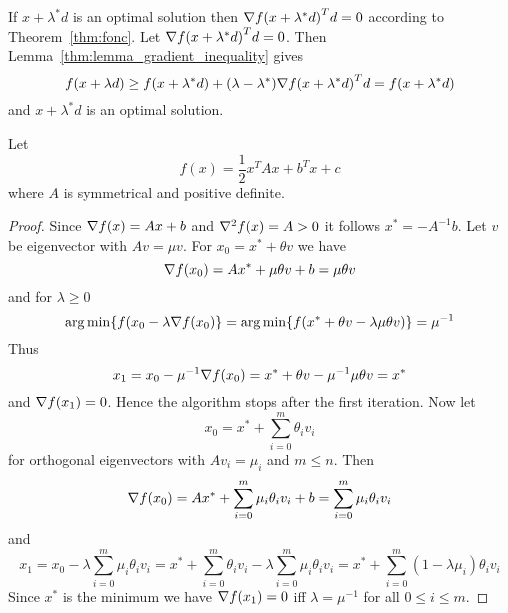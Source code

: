 \proof{}
If  \( x + \lambda^* d \) is an optimal solution then \( \nabla {f(x + \lambda^* d)}^T d = 0 \)
according to Theorem~\ref{thm:fonc}.
Let \( \nabla {f(x + \lambda^* d)}^T d = 0 \). Then Lemma~\ref{thm:lemma_gradient_inequality} gives
\[
    f(x + \lambda d) \ge f(x + \lambda^* d) + (\lambda - \lambda^*) \nabla {f(x + \lambda^* d)}^T d
    = f(x + \lambda^* d)
\]
and \( x + \lambda^* d \) is an optimal solution.
\bigskip


\begin{exercise}
    Let
    \[
        f(x) = \frac{1}{2} x^T{A}x + b^T x + c
    \]
    where \( A \) is symmetrical and positive definite.
\end{exercise}

\begin{proof}
    Since \( \nabla {f(x)} = Ax + b \) and \( \nabla^2 {f(x)} = A > 0 \) it follows \( x^* = -A^{-1}b \).
    Let \( v \) be eigenvector with \( Av = \mu v \). For \( x_0 = x^* + \theta v \) we have
    \[
        \nabla {f(x_0)} = Ax^* + \mu \theta v + b = \mu \theta v
    \]
    and for \(\lambda \ge 0 \)
    \[
        \operatorname*{arg\,min} \{ f(x_0 - \lambda \nabla f(x_0) \} =
            \operatorname*{arg\,min} \{ f(x^* + \theta v - \lambda \mu \theta v)\} = \mu^{-1}
    \]
    Thus
    \[
        x_1 = x_0 - \mu^{-1} \nabla f(x_0) = x^* + \theta v - \mu^{-1} \mu \theta v = x^*
    \]
    and \( \nabla {f(x_1)} = 0 \). Hence the algorithm stops after the first iteration.
    Now let
    \[
        x_0 = x^* + \sum_{i=0}^m \theta_i v_i
    \]
    for orthogonal eigenvectors with \( Av_i = \mu_i\) and \( m \le n \). Then
    \[
        \nabla {f(x_0)} = Ax^* + \sum_{i=0}^m \mu_i \theta_i v_i + b = \sum_{i=0}^m \mu_i \theta_i v_i
    \]
    and
    \[
        x_1 = x_0 - \lambda \sum_{i=0}^m \mu_i \theta_i v_i
        = x^* + \sum_{i=0}^m \theta_i v_i - \lambda \sum_{i=0}^m \mu_i \theta_i v_i
        = x^* + \sum_{i=0}^m (1 - \lambda \mu_i) \theta_i v_i
    \]
    Since \( x^* \) is the minimum we have \( \nabla {f(x_1)} = 0 \) iff \( \lambda = \mu^{-1} \) 
    for all \( 0 \le i \le m \).
\end{proof}
\bigskip
